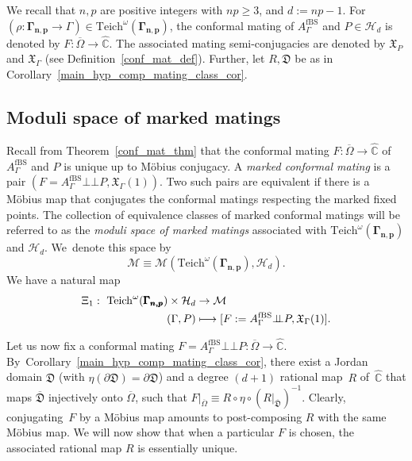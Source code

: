 \documentclass[JEP,XML,SOM,Unicode,NoFloatCountersInSection,published]{cedram}
\def\mto{\mathchoice{\longmapsto}{\mapsto}{\mapsto}{\mapsto}}
\theoremstyle{definition}
\theoremstyle{remark}
\newcommand{\C}{\mathbb{C}}
\newcommand{\cM}{\mathcal{M}}
\newcommand{\mate}{\bot \!\! \! {\bot}}
\begin{document}
We recall that $n,p$ are positive integers with $np\geq 3$, and $d:=np-1$. For \hbox{$(\rho:\pmb{\Gamma_{n,p}}\to\Gamma)\in\mathrm{Teich}^\omega(\pmb{\Gamma_{n,p}})$}, the conformal mating of $A_{\Gamma}^{\mathrm{fBS}}$ and $P\in\mathcal{H}_{d}$ is denoted by $F:\overline{\Omega}\to\widehat{\C}$. The associated mating semi-conjugacies are denoted by $\mathfrak{X}_P$ and $\mathfrak{X}_\Gamma$ (see Definition~\ref{conf_mat_def}). Further, let $R, \mathfrak{D}$ be as in Corollary~\ref{main_hyp_comp_mating_class_cor}.

\subsection{Moduli space of marked matings}\label{mating_moduli_subsec} Recall from Theorem~\ref{conf_mat_thm} that the conformal mating $F:\overline{\Omega}\to\widehat{\C}$ of $A_{\Gamma}^{\mathrm{fBS}}$ and $P$ is unique up to Möbius conjugacy. A \emph{marked conformal mating} is a pair $(F= A_{\Gamma}^{\mathrm{fBS}}\mate P, \mathfrak{X}_\Gamma(1))$. Two such pairs are equivalent if there is a Möbius map that conjugates the conformal matings respecting the marked fixed points. The collection of equivalence classes of marked conformal matings will be referred to as the \emph{moduli space of marked matings} associated with $\mathrm{Teich}^\omega(\pmb{\Gamma_{n,p}})$ and $\mathcal{H}_{d}$. We~denote this space by
\[
\cM\equiv \cM(\mathrm{Teich}^\omega(\pmb{\Gamma_{n,p}}),\mathcal{H}_{d}).
\]
We have a natural map
\begin{equation*}
\begin{split}
\Xi_1:\ \mathrm{Teich}^\omega(\pmb{\Gamma_{n,p}})\times\mathcal{H}_{d}& \to \cM\ \\
(\Gamma,P) & \mto [F:= A_{\Gamma}^{\mathrm{fBS}}\mate P, \mathfrak{X}_\Gamma(1)].
\end{split}
\label{teich_hyp_to_mating}
\end{equation*}

Let us now fix a conformal mating $F= A_{\Gamma}^{\mathrm{fBS}}\mate P:\overline{\Omega}\to\widehat{\C}$. By~Corollary~\ref{main_hyp_comp_mating_class_cor}, there exist a Jordan domain $\mathfrak{D}$ (with $\eta(\partial\mathfrak{D})=\partial\mathfrak{D}$) and a degree $(d+1)$ rational map~$R$ of~$\widehat{\C}$ that maps $\overline{\mathfrak{D}}$ injectively onto $\overline{\Omega}$, such that $F\vert_{\overline{\Omega}}\equiv R\circ\eta\circ (R\vert_{\overline{\mathfrak{D}}})^{-1}$. Clearly, conjugating~$F$ by a Möbius map amounts to post-composing $R$ with the same Möbius map.
We will now show that when a particular $F$ is chosen, the associated rational map $R$ is essentially unique.
\end{document}
